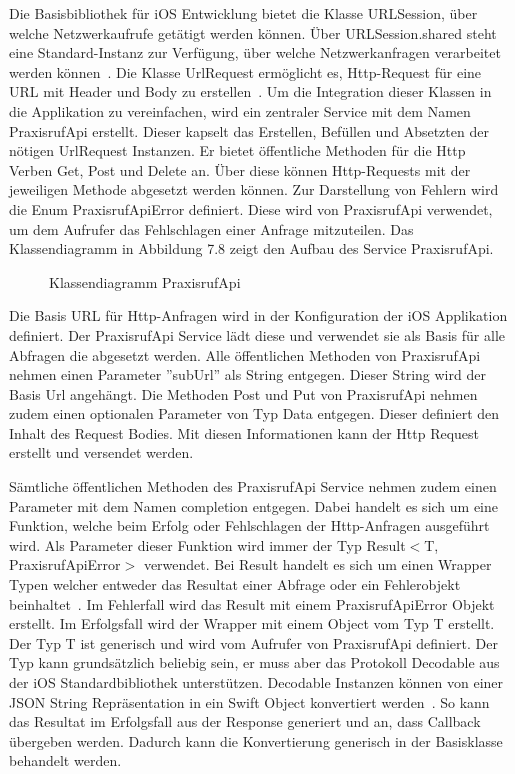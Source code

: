 Die Basisbibliothek für iOS Entwicklung bietet die Klasse URLSession, über welche Netzwerkaufrufe getätigt werden können.
Über URLSession.shared steht eine Standard-Instanz zur Verfügung, über welche Netzwerkanfragen verarbeitet werden können~\cite{ios_urlsession}.
Die Klasse UrlRequest ermöglicht es, Http-Request für eine URL mit Header und Body zu erstellen~\cite{ios_urlrequest}.
Um die Integration dieser Klassen in die Applikation zu vereinfachen, wird ein zentraler Service mit dem Namen PraxisrufApi erstellt.
Dieser kapselt das Erstellen, Befüllen und Absetzten der nötigen UrlRequest Instanzen.
Er bietet öffentliche Methoden für die Http Verben Get, Post und Delete an.
Über diese können Http-Requests mit der jeweiligen Methode abgesetzt werden können.
Zur Darstellung von Fehlern wird die Enum PraxisrufApiError definiert.
Diese wird von PraxisrufApi verwendet, um dem Aufrufer das Fehlschlagen einer Anfrage mitzuteilen.
Das Klassendiagramm in Abbildung 7.8 zeigt den Aufbau des Service PraxisrufApi\@.

\begin{figure}[h]
    \centering
    \begin{minipage}[b]{0.8\textwidth}
        \caption{Klassendiagramm PraxisrufApi}
    \end{minipage}
\end{figure}

Die Basis URL für Http-Anfragen wird in der Konfiguration der iOS Applikation definiert.
Der PraxisrufApi Service lädt diese und verwendet sie als Basis für alle Abfragen die abgesetzt werden.
Alle öffentlichen Methoden von PraxisrufApi nehmen einen Parameter ''subUrl'' als String entgegen.
Dieser String wird der Basis Url angehängt.
Die Methoden Post und Put von PraxisrufApi nehmen zudem einen optionalen Parameter von Typ Data entgegen.
Dieser definiert den Inhalt des Request Bodies.
Mit diesen Informationen kann der Http Request erstellt und versendet werden.

Sämtliche öffentlichen Methoden des PraxisrufApi Service nehmen zudem einen Parameter mit dem Namen completion entgegen.
Dabei handelt es sich um eine Funktion, welche beim Erfolg oder Fehlschlagen der Http-Anfragen ausgeführt wird.
Als Parameter dieser Funktion wird immer der Typ Result$<$T, PraxisrufApiError$>$ verwendet.
Bei Result handelt es sich um einen Wrapper Typen welcher entweder das Resultat einer Abfrage oder ein Fehlerobjekt beinhaltet~\cite{ios_result}.
Im Fehlerfall wird das Result mit einem PraxisrufApiError Objekt erstellt.
Im Erfolgsfall wird der Wrapper mit einem Object vom Typ T erstellt.
Der Typ T ist generisch und wird vom Aufrufer von PraxisrufApi definiert.
Der Typ kann grundsätzlich beliebig sein, er muss aber das Protokoll Decodable aus der iOS Standardbibliothek unterstützen.
Decodable Instanzen können von einer JSON String Repräsentation in ein Swift Object konvertiert werden~\cite{ios_decodable}.
So kann das Resultat im Erfolgsfall aus der Response generiert und an, dass Callback übergeben werden.
Dadurch kann die Konvertierung generisch in der Basisklasse behandelt werden.

